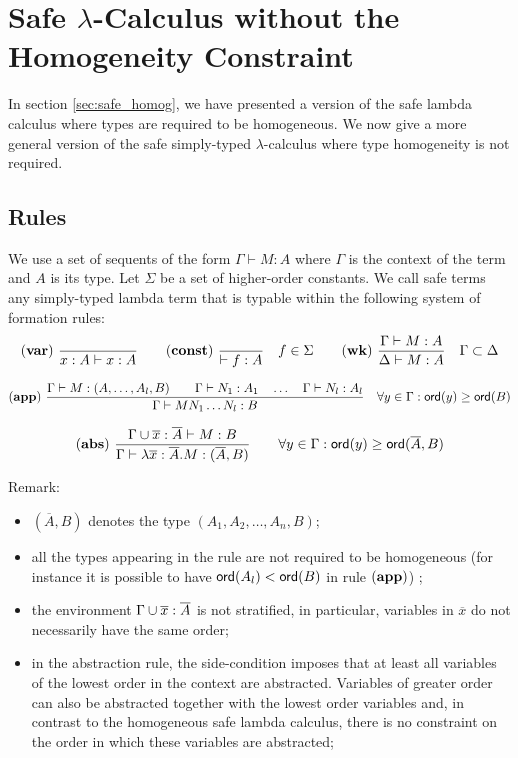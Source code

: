 \clearpage

\section{Safe $\lambda$-Calculus without the Homogeneity Constraint}
\label{sec:safe_nonhomog}


In section \ref{sec:safe_homog}, we have presented a version of the
safe lambda calculus where types are required to be homogeneous. We
now give a more general version of the safe simply-typed
$\lambda$-calculus where type homogeneity is not required.

\subsection{Rules}

We use a set of sequents of the form $\Gamma \vdash M : A$ where
$\Gamma$ is the context of the term and $A$ is its type. Let
$\Sigma$ be a set of higher-order constants. We call safe terms any
simply-typed lambda term that is typable within the following system
of formation rules:
$$ \mathbf{(var)} \   \frac{\displaystyle }{x : A\vdash x : A}
\qquad  \mathbf{(const)} \   \frac{\displaystyle }{\vdash f : A} \quad f \in \Sigma
\qquad  \mathbf{(wk)} \   \frac{\displaystyle \Gamma \vdash M : A}{\Delta \vdash M : A} \quad \Gamma \subset \Delta$$

$$ \mathbf{(app)} \  \frac{\displaystyle \Gamma \vdash M : (A,\ldots,A_l,B)
                                        \qquad \Gamma \vdash N_1 : A_1
                                        \quad \ldots \quad \Gamma \vdash N_l : A_l  }{\Gamma  \vdash M N_1 \ldots N_l : B}
                                    \quad
                                   \forall y \in \Gamma : {\sf ord}(y) \geq {\sf ord}(B)$$

$$ \mathbf{(abs)} \   \frac{\displaystyle \Gamma \cup \overline{x} : \overline{A} \vdash M : B}{\Gamma  \vdash \lambda \overline{x} : \overline{A} . M : (\overline{A},B)} \qquad
                                   \forall y \in \Gamma : {\sf ord}(y) \geq {\sf ord}(\overline{A},B)$$


Remark:
\begin{itemize}
\item $(\overline{A},B)$ denotes the type $(A_1,A_2, \ldots, A_n, B)$;
\item all the types appearing in the rule are not required to be homogeneous (for instance
it is possible to have ${\sf ord}(A_l) < {\sf ord}(B)$ in rule $\mathbf{(app)}$) ;
\item the environment $\Gamma \cup \overline{x}:\overline{A}$ is not stratified, in particular, variables in $\overline{x}$ do not necessarily have the same order;
\item in the abstraction rule, the side-condition imposes that at least all variables of the lowest order
in the context are abstracted. Variables of greater order can also be
abstracted together with the lowest order variables and, in contrast to
the homogeneous safe lambda calculus, there is no constraint on the
order in which these variables are abstracted;
\end{itemize}

